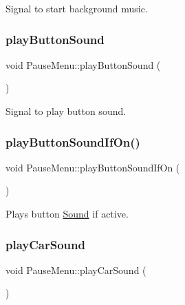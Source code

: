 Signal to start background music. 

\mbox{\label{class_pause_menu_a4ce973fdc189fbe933282d6dbf307ccc}} 
\subsubsection{\texorpdfstring{playButtonSound}{playButtonSound}}
{\footnotesize\ttfamily void Pause\+Menu\+::play\+Button\+Sound (\begin{DoxyParamCaption}{ }\end{DoxyParamCaption})\hspace{0.3cm}{\ttfamily [signal]}}



Signal to play button sound. 

\mbox{\label{class_pause_menu_ac4f80ef846911fca05673e0e11d33e20}} 
\subsubsection{\texorpdfstring{playButtonSoundIfOn()}{playButtonSoundIfOn()}}
{\footnotesize\ttfamily void Pause\+Menu\+::play\+Button\+Sound\+If\+On (\begin{DoxyParamCaption}{ }\end{DoxyParamCaption})}



Plays button \mbox{\hyperlink{class_sound}{Sound}} if active. 

\mbox{\label{class_pause_menu_aafbc3cdef6e016d6ac9c6c21a45c03b9}} 
\subsubsection{\texorpdfstring{playCarSound}{playCarSound}}
{\footnotesize\ttfamily void Pause\+Menu\+::play\+Car\+Sound (\begin{DoxyParamCaption}{ }\end{DoxyParamCaption})\hspace{0.3cm}{\ttfamily [signal]}}



